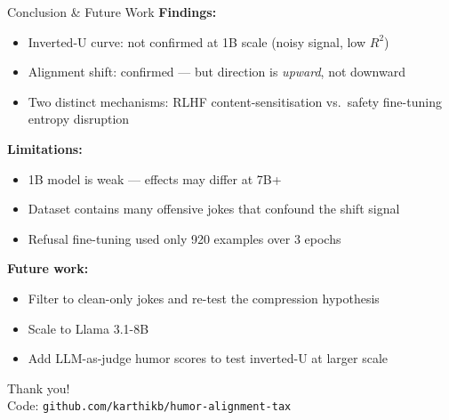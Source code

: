 \documentclass[aspectratio=169,10pt]{beamer}
\begin{document}
\begin{frame}{Conclusion \& Future Work}
  \textbf{Findings:}
  \begin{itemize}
    \item Inverted-U curve: not confirmed at 1B scale (noisy signal, low $R^2$)
    \item Alignment shift: confirmed --- but direction is \emph{upward}, not downward
    \item Two distinct mechanisms: RLHF content-sensitisation vs.\
          safety fine-tuning entropy disruption
  \end{itemize}

  \vspace{0.6em}
  \textbf{Limitations:}
  \begin{itemize}
    \item 1B model is weak --- effects may differ at 7B+
    \item Dataset contains many offensive jokes that confound the shift signal
    \item Refusal fine-tuning used only 920 examples over 3 epochs
  \end{itemize}

  \vspace{0.6em}
  \textbf{Future work:}
  \begin{itemize}
    \item Filter to clean-only jokes and re-test the compression hypothesis
    \item Scale to Llama 3.1-8B
    \item Add LLM-as-judge humor scores to test inverted-U at larger scale
  \end{itemize}
\end{frame}

\begin{frame}[plain]
  \begin{center}
    \Huge Thank you!\\[1em]
    \large Code: \texttt{github.com/karthikb/humor-alignment-tax}
  \end{center}
\end{frame}
\end{document}
